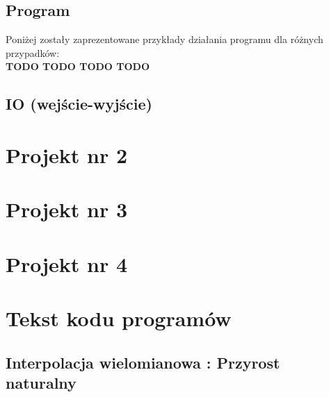\documentclass[a4paper,12pt]{article}
\newcommand{\id}{\noindent}
\begin{document}
\subsection{Program}

\id
Poniżej zostały zaprezentowane przykłady działania programu dla różnych przypadków: \\

\textbf{TODO TODO TODO TODO}

\subsection{IO (wejście-wyjście)}




\section{Projekt nr 2}

\section{Projekt nr 3}

\section{Projekt nr 4}

\section{Tekst kodu programów}

\subsection{Interpolacja wielomianowa : Przyrost naturalny}
\end{document}
